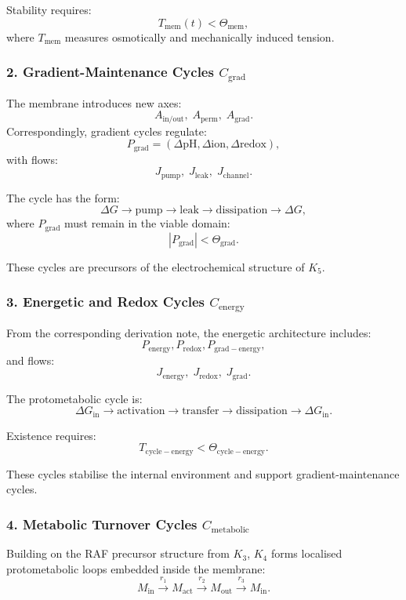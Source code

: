 Stability requires:
\[
  T_{\mathrm{mem}}(t) < \Theta_{\mathrm{mem}},
\]
where $T_{\mathrm{mem}}$ measures osmotically and mechanically
induced tension.

\subsubsection{2. Gradient-Maintenance Cycles $C_{\mathrm{grad}}$}

The membrane introduces new axes:
\[
  A_{\mathrm{in/out}},\;
  A_{\mathrm{perm}},\;
  A_{\mathrm{grad}}.
\]
Correspondingly, gradient cycles regulate:
\[
  P_{\mathrm{grad}}=
    (\Delta \mathrm{pH}, \Delta \mathrm{ion}, \Delta \mathrm{redox}),
\]
with flows:
\[
  J_{\mathrm{pump}},\;
  J_{\mathrm{leak}},\;
  J_{\mathrm{channel}}.
\]

The cycle has the form:
\[
  \Delta G \to \mathrm{pump} \to
  \mathrm{leak} \to \mathrm{dissipation} \to
  \Delta G,
\]
where $P_{\mathrm{grad}}$ must remain in the viable domain:
\[
  |P_{\mathrm{grad}}| < \Theta_{\mathrm{grad}}.
\]

These cycles are precursors of the electrochemical structure of $K_5$.

\subsubsection{3. Energetic and Redox Cycles $C_{\mathrm{energy}}$}

From the corresponding derivation note, the energetic architecture includes:
\[
  P_{\mathrm{energy}},
  P_{\mathrm{redox}},
  P_{\mathrm{grad-energy}},
\]
and flows:
\[
  J_{\mathrm{energy}},\;
  J_{\mathrm{redox}},\;
  J_{\mathrm{grad}}.
\]

The protometabolic cycle is:
\[
  \Delta G_{\mathrm{in}} \to
  \mathrm{activation} \to
  \mathrm{transfer} \to
  \mathrm{dissipation} \to
  \Delta G_{\mathrm{in}}.
\]

Existence requires:
\[
  T_{\mathrm{cycle-energy}} < \Theta_{\mathrm{cycle-energy}}.
\]

These cycles stabilise the internal environment and support
gradient-maintenance cycles.

\subsubsection{4. Metabolic Turnover Cycles $C_{\mathrm{metabolic}}$}

Building on the RAF precursor structure from $K_3$, $K_4$ forms
localised protometabolic loops embedded inside the membrane:
\[
  M_{\mathrm{in}} \xrightarrow{r_1}
  M_{\mathrm{act}} \xrightarrow{r_2}
  M_{\mathrm{out}} \xrightarrow{r_3}
  M_{\mathrm{in}}.
\]

